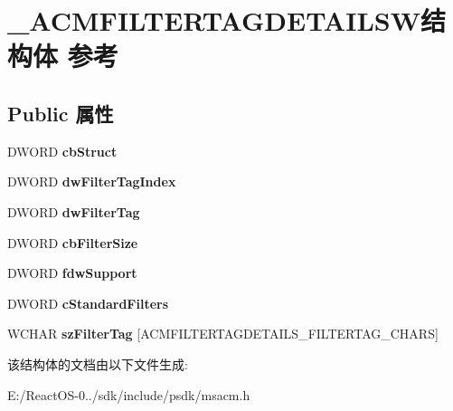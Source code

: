 \hypertarget{struct___a_c_m_f_i_l_t_e_r_t_a_g_d_e_t_a_i_l_s_w}{}\section{\+\_\+\+A\+C\+M\+F\+I\+L\+T\+E\+R\+T\+A\+G\+D\+E\+T\+A\+I\+L\+S\+W结构体 参考}
\label{struct___a_c_m_f_i_l_t_e_r_t_a_g_d_e_t_a_i_l_s_w}
\subsection*{Public 属性}
\begin{DoxyCompactItemize}
\item 
\mbox{\label{struct___a_c_m_f_i_l_t_e_r_t_a_g_d_e_t_a_i_l_s_w_a4e76732a14d064bb139614510791b154}} 
D\+W\+O\+RD {\bfseries cb\+Struct}
\item 
\mbox{\label{struct___a_c_m_f_i_l_t_e_r_t_a_g_d_e_t_a_i_l_s_w_a96e4f0c891b6c1fa427406802ff1daf2}} 
D\+W\+O\+RD {\bfseries dw\+Filter\+Tag\+Index}
\item 
\mbox{\label{struct___a_c_m_f_i_l_t_e_r_t_a_g_d_e_t_a_i_l_s_w_a33f0431ed031b0c909d79d8447e1c0b9}} 
D\+W\+O\+RD {\bfseries dw\+Filter\+Tag}
\item 
\mbox{\label{struct___a_c_m_f_i_l_t_e_r_t_a_g_d_e_t_a_i_l_s_w_af614ecfb817cdf5b0a3f1aab816c6a2d}} 
D\+W\+O\+RD {\bfseries cb\+Filter\+Size}
\item 
\mbox{\label{struct___a_c_m_f_i_l_t_e_r_t_a_g_d_e_t_a_i_l_s_w_a1497f40f231f56de2c6545873ffbe159}} 
D\+W\+O\+RD {\bfseries fdw\+Support}
\item 
\mbox{\label{struct___a_c_m_f_i_l_t_e_r_t_a_g_d_e_t_a_i_l_s_w_a5aaaf3e7784af8f29f383b2c9c0291c0}} 
D\+W\+O\+RD {\bfseries c\+Standard\+Filters}
\item 
\mbox{\label{struct___a_c_m_f_i_l_t_e_r_t_a_g_d_e_t_a_i_l_s_w_a54f78af7879af8abab0c7d3f01db4206}} 
W\+C\+H\+AR {\bfseries sz\+Filter\+Tag} \mbox{[}A\+C\+M\+F\+I\+L\+T\+E\+R\+T\+A\+G\+D\+E\+T\+A\+I\+L\+S\+\_\+\+F\+I\+L\+T\+E\+R\+T\+A\+G\+\_\+\+C\+H\+A\+RS\mbox{]}
\end{DoxyCompactItemize}


该结构体的文档由以下文件生成\+:\begin{DoxyCompactItemize}
\item 
E\+:/\+React\+O\+S-\/0../sdk/include/psdk/msacm.\+h\end{DoxyCompactItemize}
